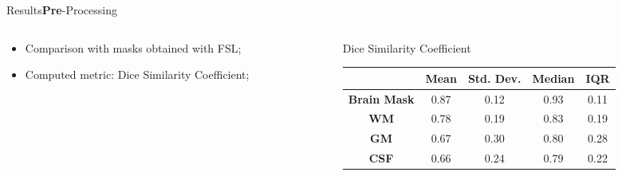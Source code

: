 \documentclass[]{standalone}
\begin{document}
	\begin{frame}{Results}{\textbf{Pre}-Processing}
	\vspace{-28pt}
	
	\begin{columns}
		\begin{column}{0.35\textwidth}
		\begin{itemize}
	
		\item Comparison with masks obtained with FSL;
		\item Computed metric: Dice Similarity Coefficient;
	\end{itemize}
		\end{column}
		
		\begin{column}{0.65\textwidth}
		\begin{block}{Dice Similarity Coefficient}
		\begin{table}[h!]
			\centering
			\small
			\setlength{\tabcolsep}{3pt}
			\begin{tabular}{c|cccc}
					    & \textbf{Mean} & \textbf{Std. Dev.} & \textbf{Median} & \textbf{IQR} \\ \hline
			\textbf{Brain Mask} & 0.87          & 0.12               & 0.93            & 0.11         \\
			\textbf{WM}         & 0.78          & 0.19               & 0.83            & 0.19         \\
			\textbf{GM}         & 0.67          & 0.30               & 0.80            & 0.28         \\
			\textbf{CSF}        & 0.66          & 0.24               & 0.79            & 0.22        
			\end{tabular}
			\end{table}
			\vspace{-10pt}
		\end{block}
			\vspace{-5pt}
			\begin{figure}[h!]
			\tiny
			\centering
				\begin{subfigure}{0.3\textwidth}

\end{subfigure}
\end{figure}
\end{column}
\end{columns}
\end{frame}
\end{document}
